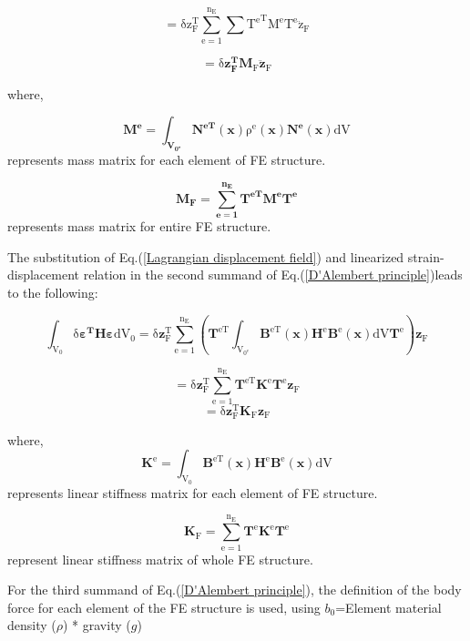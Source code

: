 \begin{equation}
\mathrm{=\delta z_{F}^{T}\sum_{e=1}^{n_{E}}{\sum}{T^{e}}^{T}M^{e}T^{e}\ddot{z}_{F}}
\end{equation}

\begin{equation}
\mathrm{=\delta\boldsymbol{z_{F}^{T}}\boldsymbol{M}_{F}\ddot{\boldsymbol{z}}_{F}}\label{first term of D'Alembert principle}
\end{equation}

where,

\[
\mathrm{\mathbf{M^{e}=\int_{\mathbf{V_{0^{e}}}}N^{eT}}(\mathbf{x})\rho^{e}(\mathbf{x})\mathbf{N^{e}}(\mathbf{x})dV}
\]
represents mass matrix for each element of FE structure.

\[
\mathbf{M_{F}=\sum_{e=1}^{n_{E}}T^{eT}M^{e}T^{e}}
\]
represents mass matrix for entire FE structure.

The substitution of Eq.(\ref{Lagrangian displacement field}) and
linearized strain-displacement relation in the second summand of Eq.(\ref{D'Alembert principle})leads
to the following:


\begin{equation}
\mathrm{\mathrm{\int_{V_{0}}\delta\mathbf{\varepsilon^{T}H\varepsilon}dV_{0}=\delta\mathbf{z}_{F}^{T}\sum_{e=1}^{n_{E}}(\mathbf{T}^{eT}\int_{V_{0^{e}}}\mathbf{B}^{eT}(\mathbf{x})\mathbf{H}^{e}\mathbf{B}^{e}(\mathbf{x})dV\mathbf{T}^{e})\mathbf{z}_{F}}}
\end{equation}


\[
\mathrm{\mathrm{=\delta}\mathbf{z}_{F}^{T}\sum_{e=1}^{n_{E}}\mathbf{T}^{eT}\mathbf{K}^{e}\mathbf{T}^{e}\mathbf{\mathbf{z}}_{F}}
\]
\begin{equation}
\mathrm{\mathrm{=\delta}\mathbf{z}_{F}^{T}\mathbf{K}_{F}\mathbf{z}_{F}}\label{second term of D'Alembert principle}
\end{equation}


where,
\[
\mathrm{\mathbf{K}^{e}=\int_{V_{0}}\mathbf{B}^{eT}(\mathbf{x})\mathbf{H}^{e}\mathbf{B}^{e}(\mathbf{x})dV}
\]
represents linear stiffness matrix for each element of FE structure.

\[
\mathrm{\mathbf{K}_{F}=\sum_{e=1}^{n_{E}}\mathbf{T}^{e}\mathbf{K}^{e}\mathbf{T}^{e}}
\]
represent linear stiffness matrix of whole FE structure.


For the third summand of Eq.(\ref{D'Alembert principle}), the definition
of the body force for each element of the FE structure is used, using
$b_{0}$=Element material density ($\rho$) {*} gravity ($g$)


